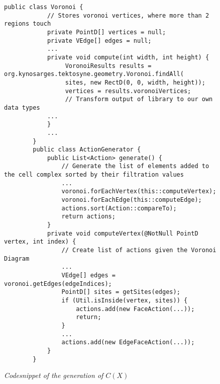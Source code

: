 \lstset{language=Java}
\begin{figure}
    \begin{lstlisting}[frame=single]
        public class Voronoi {
            // Stores voronoi vertices, where more than 2 regions touch
            private PointD[] vertices = null;
            private VEdge[] edges = null;
            ...
            private void compute(int width, int height) {
                 VoronoiResults results = org.kynosarges.tektosyne.geometry.Voronoi.findAll(
                 sites, new RectD(0, 0, width, height));
                 vertices = results.voronoiVertices;
                 // Transform output of library to our own data types
            ...
            }
            ...
        }
        public class ActionGenerator {
            public List<Action> generate() {
                // Generate the list of elements added to the cell complex sorted by their filtration values
                ...
                voronoi.forEachVertex(this::computeVertex);
                voronoi.forEachEdge(this::computeEdge);
                actions.sort(Action::compareTo);
                return actions;
            }
            private void computeVertex(@NotNull PointD vertex, int index) {
                // Create list of actions given the Voronoi Diagram
                ...
                VEdge[] edges = voronoi.getEdges(edgeIndices);
                PointD[] sites = getSites(edges);
                if (Util.isInside(vertex, sites)) {
                    actions.add(new FaceAction(...));
                    return;
                }
                ...
                actions.add(new EdgeFaceAction(...));
            }
        }
    \end{lstlisting}
    \caption{\textit{Codesnippet of the generation of $C(X)$}}
    \label{fig3}
\end{figure}